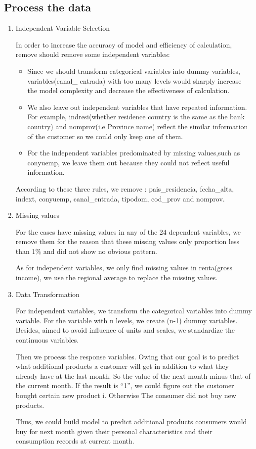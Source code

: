 \documentclass{article}
\begin{document}
\subsection{Process the data}
\begin{enumerate}
\item Independent Variable Selection

In order to increase the accuracy of model and efficiency of calculation, remove should remove some independent variables:

\begin{itemize}
\item Since we should transform categorical variables into dummy variables, variables(canal\_ entrada) with too many levels would sharply increase the model complexity and decrease the effectiveness of calculation.

\item We also leave out independent variables that have repeated information. For example, indresi(whether residence country is the same as the bank country) and nomprov(i.e Province name) reflect the similar information of the customer so we could only keep one of them. 

\item For the independent variables predominated by missing values,such as conyuemp, we leave them out because they could not reflect useful information. 
\end{itemize}

According to these three  rules, we remove : pais\_residencia, fecha\_alta, indext, conyuemp, canal\_entrada, tipodom, cod\_prov and nomprov. 

\item  Missing values

For the cases have missing values in any of the 24 dependent variables, we remove them for the reason that these missing values only proportion less than 1\% and did not show no obvious pattern. 

As for independent variables, we only find missing values in renta(gross income), we use the regional average to replace the missing values. 

\item Data Transformation

For independent variables, we transform the categorical variables into dummy variable. For the variable with n levels, we create (n-1) dummy variables. Besides, aimed to avoid influence of units and scales, we standardize the continuous variables. 

Then we process the response variables.  Owing that our goal is to predict what additional products a customer will get in addition to what they already have at the last month. So the value of the next month minus that of the current month.  If the result is “1”, we could figure out the customer bought certain new product i. Otherwise The consumer did not buy new products. 

Thus, we could build model to predict additional products consumers would buy for next month given their personal characteristics and their consumption records at current month.
\end{enumerate}
\end{document}
